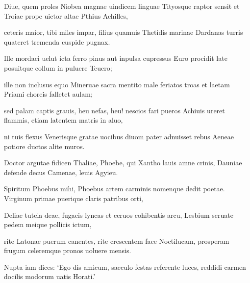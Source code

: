 \documentclass{book}
\newenvironment {carmen} [1] [\relax] 
  {\Titulus \Versus \incipit*\numerus{1}#1}
  {\endVersus}
\newcommand {\Sapphic}   {\Forma \strophae {0 \poena 00 \poena 1}}
\begin{document}
\begin{carmen}[\Sapphic]


Diue, quem proles Niobea magnae
 uindicem linguae Tityosque raptor
 sensit et Troiae prope uictor altae
      Pthius Achilles,
 
ceteris maior, tibi miles impar,               
 filius quamuis Thetidis marinae
 Dardanas turris quateret tremenda
      cuspide pugnax.
 
Ille mordaci uelut icta ferro
 pinus aut inpulsa cupressus Euro               
 procidit late posuitque collum in
      puluere Teucro;
 
ille non inclusus equo Mineruae
 sacra mentito male feriatos
 troas et laetam Priami choreis               
      falletet aulam;
 
sed palam captis grauis, heu nefas, heu!
 nescios fari pueros Achiuis
 ureret flammis, etiam latentem
      matris in aluo,               
 
ni tuis flexus Venerisque gratae
 uocibus diuom pater adnuisset
 rebus Aeneae potiore ductos
      alite muros.
 
Doctor argutae fidicen Thaliae,               
 Phoebe, qui Xantho lauis amne crinis,
 Dauniae defende decus Camenae,
      leuis Agyieu.
 
Spiritum Phoebus mihi, Phoebus artem
 carminis nomenque dedit poetae.               
 Virginum primae puerique claris
      patribus orti,
 
Deliae tutela deae, fugacis
 lyncas et ceruos cohibentis arcu,
 Lesbium seruate pedem meique               
      pollicis ictum,
 
rite Latonae puerum canentes,
 rite crescentem face Noctilucam,
 prosperam frugum celeremque pronos
      uoluere mensis.               
 
Nupta iam dices: `Ego dis amicum,
 saeculo festas referente luces,
 reddidi carmen docilis modorum
      uatis Horati.'
 

\end{carmen}
\end{document}
